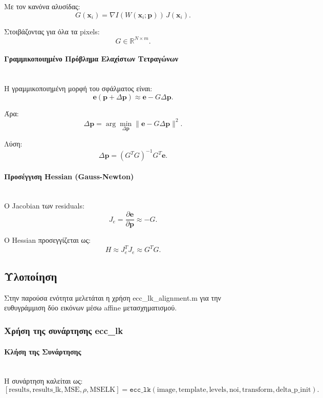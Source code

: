 \documentclass[12pt]{article}
\begin{document}
Με τον κανόνα αλυσίδας:
\[
G(\mathbf{x}_i)=
\nabla I(W(\mathbf{x}_i;\mathbf{p}))\,J(\mathbf{x}_i).
\]

Στοιβάζοντας για όλα τα pixels:
\[
G \in \mathbb{R}^{N\times m}.
\]

\paragraph{Γραμμικοποιημένο Πρόβλημα Ελαχίστων Τετραγώνων}
\mbox{}\\
Η γραμμικοποιημένη μορφή του σφάλματος είναι:
\[
\mathbf{e}(\mathbf{p}+\Delta\mathbf{p})
\approx
\mathbf{e}-G\Delta\mathbf{p}.
\]

Άρα:
\[
\Delta\mathbf{p} =
\arg\min_{\Delta\mathbf{p}}
\|\mathbf{e}-G\Delta\mathbf{p}\|^2.
\]

Λύση:
\[
\Delta\mathbf{p} = (G^T G)^{-1} G^T \mathbf{e}.
\]

\paragraph{Προσέγγιση Hessian (Gauss-Newton)}
\mbox{}\\
Ο Jacobian των residuals:
\[
J_e = \frac{\partial \mathbf{e}}{\partial \mathbf{p}}
\approx -G.
\]



Ο Hessian προσεγγίζεται ως:
\[
H \approx J_e^T J_e \approx G^T G.
\]







\subsection{Υλοποίηση}
Στην παρούσα ενότητα μελετάται η χρήση ecc\_lk\_alignment.m για την ευθυγράμμιση δύο εικόνων μέσω affine μετασχηματισμού.
\subsubsection{Χρήση της συνάρτησης ecc\_lk}
\paragraph{Κλήση της Συνάρτησης}
\mbox{}\\
Η συνάρτηση καλείται ως:
\[
[\text{results}, \text{results\_lk}, \text{MSE}, \rho, \text{MSELK}]
=
\texttt{ecc\_lk}(\text{image}, \text{template}, \text{levels}, \text{noi}, \text{transform}, \text{delta\_p\_init}).
\]
\end{document}
